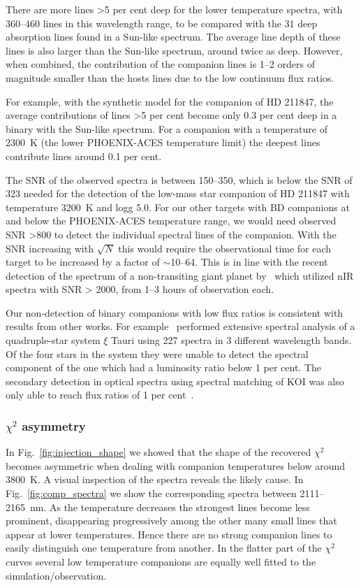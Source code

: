\documentclass[fleqn,usenatbib]{mnras}
\begin{document}
There are more lines >5 per cent deep for the lower temperature spectra, with 360--460 lines in this wavelength range, to be compared with the 31 deep absorption lines found in a Sun-like spectrum. The average line depth of these lines is also larger than the Sun-like spectrum, around twice as deep. However, when combined, the contribution of the companion lines is 1--2 orders of magnitude smaller than the hosts lines due to the low continuum flux ratios.

For example, with the synthetic model for the companion of {HD 211847}, the average contributions of lines >5 per cent become only 0.3 per cent deep in a binary with the Sun-like spectrum. For a companion with a temperature of 2300~K (the lower PHOENIX-ACES temperature limit) the deepest lines contribute lines around 0.1 per cent.

The SNR of the observed spectra is between 150--350, which is below the SNR of 323 needed for the detection of the low-mass star companion of {HD 211847} with temperature 3200~K and logg 5.0. For our other targets with BD companions at and below the PHOENIX-ACES temperature range, we would need observed SNR >800 to detect the individual spectral lines of the companion. With the SNR increasing with \(\sqrt{N}\) this would require the observational time for each target to be increased by a factor of \(\sim\)10--64.
{This is in line with the recent detection of the spectrum of a non-transiting giant planet by~\citet{piskorz_evidence_2016} which utilized nIR spectra with SNR > 2000, from 1--3 hours of observation each.}

Our non-detection of binary companions with low flux ratios is consistent with results from other works. For example~\citet{nemravova_xtauri_2016} performed extensive spectral analysis of a quadruple-star system {$\xi$ Tauri} using 227 spectra in 3 different wavelength bands. Of the four stars in the system they were unable to detect the spectral component of the one which had a luminosity ratio below 1 per cent. {The secondary detection in optical spectra using spectral matching of KOI was also only able to reach flux ratios of 1 per cent~\citet{kolbl_detection_2015}.}



\subsubsection{\(\chi^2\) asymmetry}
\label{subsubsec:chi2_assymetry}
In Fig.~\ref{fig:injection_shape} we showed that the shape of the recovered \(\chi^2\) becomes asymmetric when dealing with companion temperatures below around 3800~K. A visual inspection of the spectra reveals the likely cause. In Fig.~\ref{fig:comp_spectra} we show the corresponding spectra between 2111--2165~nm. As the temperature decreases the strongest lines become less prominent, disappearing progressively among the other many small lines that appear at lower temperatures. Hence there are no strong companion lines to easily distinguish one temperature from another. In the flatter part of the \(\chi^2\) curves several low temperature companions are equally well fitted to the simulation/observation.
\end{document}
